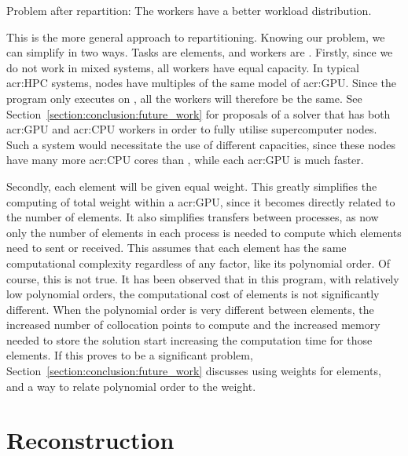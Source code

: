 \begin{table}[H]
\begin{center}
		\caption{Problem after repartition: The workers have a better workload distribution.}\label{table:after_repartition}
	\end{center}
\end{table}

This is the more general approach to repartitioning. Knowing our problem, we can simplify in two
ways. Tasks are elements, and workers are . Firstly, since we do not work in
mixed systems, all workers have equal capacity. In typical \acrshort{acr:HPC} systems, nodes have
multiples of the same model of \acrshort{acr:GPU}. Since the program only executes on
, all the workers will therefore be the same. See
Section~\ref{section:conclusion:future_work} for proposals of a solver that has both
\acrshort{acr:GPU} and \acrshort{acr:CPU} workers in order to fully utilise supercomputer nodes.
Such a system would necessitate the use of different capacities, since these nodes have many more
\acrshort{acr:CPU} cores than , while each \acrshort{acr:GPU} is much faster. 

Secondly, each element will be given equal weight. This greatly simplifies the computing of total
weight within a \acrshort{acr:GPU}, since it becomes  directly related to the number of elements. It
also simplifies transfers between processes, as now only the number of elements in each process is
needed to compute which elements need to sent or received. This assumes that each element has the
same computational complexity regardless of any factor, like its polynomial order. Of course, this
is not true. It has been observed that in this program, with relatively low polynomial orders, the
computational cost of elements is not significantly different. When the polynomial order is very
different between elements, the increased number of collocation points to compute and the increased
memory needed to store the solution start increasing the computation time for those elements. If
this proves to be a significant problem, Section~\ref{section:conclusion:future_work} discusses
using weights for elements, and a way to relate polynomial order to the weight. 

\section{Reconstruction}\label{section:load_balancing:reconstruction}

